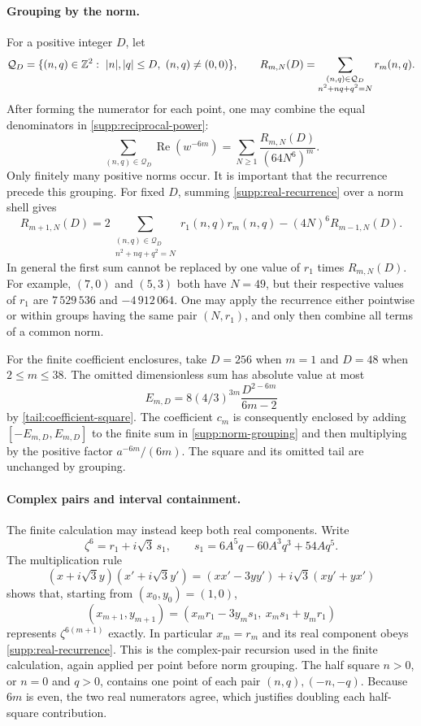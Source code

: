 \paragraph{Grouping by the norm.}
For a positive integer $D$, let
\[
 \mathcal Q_D=\{(n,q)\in\Z^2:\ |n|,|q|\leq D,\ (n,q)\ne(0,0)\},
 \qquad
 R_{m,N}(D)=\sum_{\substack{(n,q)\in\mathcal Q_D\\n^2+nq+q^2=N}}
                         r_m(n,q).
\]
After forming the numerator for each point, one may combine the equal
denominators in \eqref{supp:reciprocal-power}:
\begin{equation}
 \sum_{(n,q)\in\mathcal Q_D}\operatorname{Re}(w^{-6m})
 =\sum_{N\geq1}\frac{R_{m,N}(D)}{(64N^6)^m}.
 \label{supp:norm-grouping}
\end{equation}
Only finitely many positive norms occur.  It is important that the
recurrence precede this grouping.  For fixed $D$, summing
\eqref{supp:real-recurrence} over a norm shell gives
\[
 R_{m+1,N}(D)
 =2\sum_{\substack{(n,q)\in\mathcal Q_D\\n^2+nq+q^2=N}}
       r_1(n,q)r_m(n,q)-(4N)^6R_{m-1,N}(D).
\]
In general the first sum cannot be replaced by one value of $r_1$ times
$R_{m,N}(D)$.  For example, $(7,0)$ and $(5,3)$ both have $N=49$, but
their respective values of $r_1$ are $7\,529\,536$ and $-4\,912\,064$.
One may apply the recurrence either pointwise or within groups having the
same pair $(N,r_1)$, and only then combine all terms of a common norm.

For the finite coefficient enclosures, take $D=256$ when $m=1$ and $D=48$
when $2\leq m\leq38$.  The omitted dimensionless sum has absolute value
at most
\[
 E_{m,D}=8(4/3)^{3m}\frac{D^{2-6m}}{6m-2}
\]
by \eqref{tail:coefficient-square}.  The coefficient $c_m$ is consequently
enclosed by adding $[-E_{m,D},E_{m,D}]$ to the finite sum in
\eqref{supp:norm-grouping} and then multiplying by the positive factor
$a^{-6m}/(6m)$.  The square and its omitted tail are unchanged by grouping.

\paragraph{Complex pairs and interval containment.}
The finite calculation may instead keep both real components.  Write
\[
 \zeta^6=r_1+i\sqrt3\,s_1,\qquad
 s_1=6A^5q-60A^3q^3+54Aq^5.
\]
The multiplication rule
\[
 (x+i\sqrt3y)(x'+i\sqrt3y')
 =(xx'-3yy')+i\sqrt3(xy'+yx')
\]
shows that, starting from $(x_0,y_0)=(1,0)$,
\[
 (x_{m+1},y_{m+1})
 =(x_mr_1-3y_ms_1,\ x_ms_1+y_mr_1)
\]
represents $\zeta^{6(m+1)}$ exactly.  In particular $x_m=r_m$ and its real
component obeys \eqref{supp:real-recurrence}.  This is the complex-pair
recursion used in the finite calculation, again applied per point before
norm grouping.  The half square $n>0$, or $n=0$ and $q>0$, contains one
point of each pair $(n,q),(-n,-q)$.  Because $6m$ is even, the two real
numerators agree, which justifies doubling each half-square contribution.

